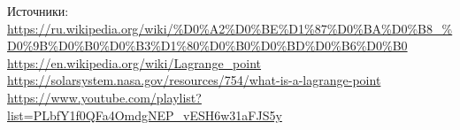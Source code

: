 \documentclass{article}
\begin{document}
    Источники:
    \\
    \url{https://ru.wikipedia.org/wiki/%D0%A2%D0%BE%D1%87%D0%BA%D0%B8_%D0%9B%D0%B0%D0%B3%D1%80%D0%B0%D0%BD%D0%B6%D0%B0}
    \\
    \url{https://en.wikipedia.org/wiki/Lagrange_point}
    \\
    \url{https://solarsystem.nasa.gov/resources/754/what-is-a-lagrange-point}
    \\
    \url{https://www.youtube.com/playlist?list=PLbfY1f0QFa4OmdgNEP_vESH6w31aFJS5y}
    \\
\end{document}
